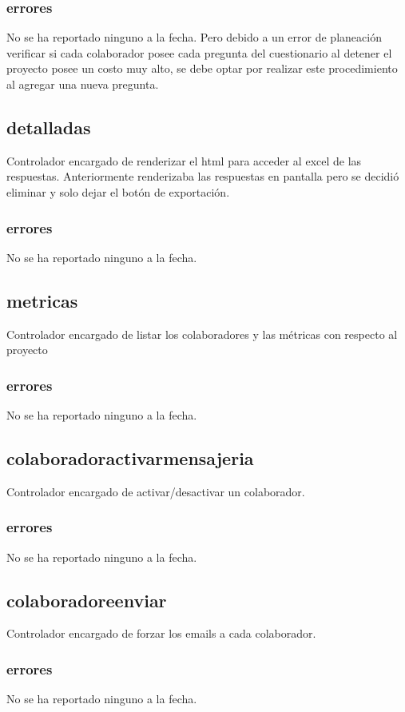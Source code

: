\documentclass[10pt,a4paper]{book}
\begin{document}
	\subsubsection{errores}
	No se ha reportado ninguno a la fecha. Pero debido a un error de planeación verificar si cada colaborador posee cada pregunta del cuestionario al detener el proyecto posee un costo muy alto, se debe optar por realizar este procedimiento al agregar una nueva pregunta.

	\subsection{detalladas}
	Controlador encargado de renderizar el html para acceder al excel de las respuestas. Anteriormente renderizaba las respuestas en pantalla pero se decidió eliminar y solo dejar el botón  de exportación.
	\subsubsection{errores}
	No se ha reportado ninguno a la fecha.

	\subsection{metricas}
	Controlador encargado de listar los colaboradores y las métricas con respecto al proyecto
	\subsubsection{errores}
	No se ha reportado ninguno a la fecha.

	\subsection{colaboradoractivarmensajeria}
	Controlador encargado de activar/desactivar un colaborador.
	\subsubsection{errores}
	No se ha reportado ninguno a la fecha.

	\subsection{colaboradoreenviar}
	Controlador encargado de forzar los emails a cada colaborador.
	\subsubsection{errores}
	No se ha reportado ninguno a la fecha.
\end{document}
